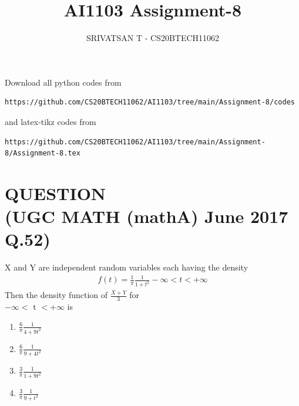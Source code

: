 \documentclass[journal,12pt,twocolumn]{IEEEtran}
\begin{document}
    \def\midbox#1{\raisebox{-0.5\baselineskip}[0in][0in]{#1}}
    \vspace{3cm}
    \title{AI1103 Assignment-8}
    \author{SRIVATSAN T - CS20BTECH11062}
    \maketitle
    \newpage
    \bigskip
    \renewcommand{\thefigure}{\theenumi}
    \renewcommand{\thetable}{\theenumi}
    Download all python codes from
    \begin{lstlisting}
https://github.com/CS20BTECH11062/AI1103/tree/main/Assignment-8/codes
\end{lstlisting}
    and latex-tikz codes from
    \begin{lstlisting}
https://github.com/CS20BTECH11062/AI1103/tree/main/Assignment-8/Assignment-8.tex
\end{lstlisting}
    \section*{QUESTION\\(UGC MATH (mathA) June 2017 Q.52)}
    X and Y are independent random variables each having the density
    \begin{align}
        f(t) = \displaystyle\frac{1}{\pi} \frac{1}{1+{t}^2} -\infty < t < +\infty
    \end{align}
    Then the density function of $\displaystyle\frac{X+Y}{3}$ for \\$-\infty <$ t $< +\infty$ is\bigskip
        \begin{enumerate}\itemsep0.5cm
            \item $\displaystyle\frac{6}{\pi} \frac{1}{4+9{t}^2}$
            \item $\displaystyle\frac{6}{\pi} \frac{1}{9+4{t}^2}$
            \item $\displaystyle\frac{3}{\pi} \frac{1}{1+9{t}^2}$
            \item $\displaystyle\frac{3}{\pi} \frac{1}{9+{t}^2}$
        \end{enumerate}
\end{document}

